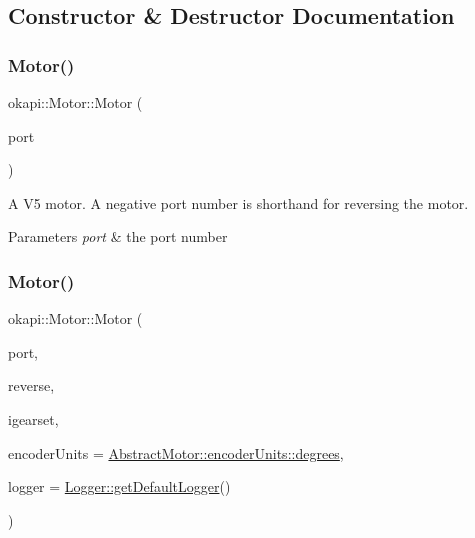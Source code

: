 \subsection{Constructor \& Destructor Documentation}
\mbox{\label{classokapi_1_1Motor_ae4d1eab9f7140508db8146adf6f4d8df}} 
\subsubsection{\texorpdfstring{Motor()}{Motor()}\hspace{0.1cm}{\footnotesize\ttfamily [1/2]}}
{\footnotesize\ttfamily okapi\+::\+Motor\+::\+Motor (\begin{DoxyParamCaption}\item[{std\+::int8\+\_\+t}]{port }\end{DoxyParamCaption})}

A V5 motor. A negative port number is shorthand for reversing the motor.


\begin{DoxyParams}{Parameters}
{\em port} & the port number \\
\hline
\end{DoxyParams}
\mbox{\label{classokapi_1_1Motor_afb244f7c74a9f6c6e2c40a8d7a5915ac}} 
\subsubsection{\texorpdfstring{Motor()}{Motor()}\hspace{0.1cm}{\footnotesize\ttfamily [2/2]}}
{\footnotesize\ttfamily okapi\+::\+Motor\+::\+Motor (\begin{DoxyParamCaption}\item[{std\+::uint8\+\_\+t}]{port,  }\item[{bool}]{reverse,  }\item[{\mbox{\hyperlink{classokapi_1_1AbstractMotor_a88aaa6ea2fa10f5520a537bbf26774d5}{Abstract\+Motor\+::gearset}}}]{igearset,  }\item[{\mbox{\hyperlink{classokapi_1_1AbstractMotor_ae811cd825099f2defadeb1b7f7e7764c}{Abstract\+Motor\+::encoder\+Units}}}]{encoder\+Units = {\ttfamily \mbox{\hyperlink{classokapi_1_1AbstractMotor_ae811cd825099f2defadeb1b7f7e7764ca18daee01fc6e54aacd7f4c2eef60ff4d}{Abstract\+Motor\+::encoder\+Units\+::degrees}}},  }\item[{const std\+::shared\+\_\+ptr$<$ \mbox{\hyperlink{classokapi_1_1Logger}{Logger}} $>$ \&}]{logger = {\ttfamily \mbox{\hyperlink{classokapi_1_1Logger_a5053cf778b4b55acba788a3797dc96d2}{Logger\+::get\+Default\+Logger}}()} }\end{DoxyParamCaption})\hspace{0.3cm}{\ttfamily [explicit]}}



